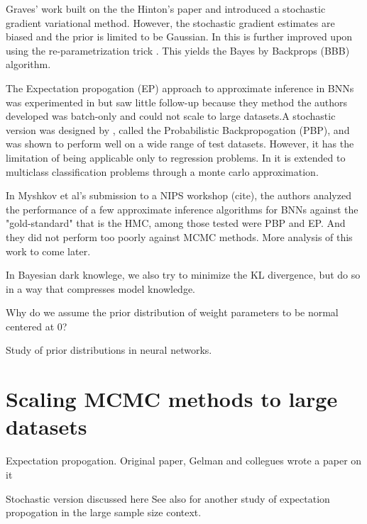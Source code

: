 \documentclass[12pt]{report}
\begin{document}
\begin{enumerate}
Graves' work \cite{graves2011practical} built on the the Hinton's paper and introduced a stochastic gradient variational method. However, the stochastic gradient estimates are biased and the prior is limited to be Gaussian. In \cite{blundell2015weight} this is further improved upon using the re-parametrization trick \cite{opper2009variational,kingma2013auto,rezende2014stochastic}. This yields the Bayes by Backprops (BBB) algorithm.

The Expectation propogation (EP) approach to approximate inference in BNNs was experimented in \cite{jylanki2014expectation} but saw little follow-up because they method the authors developed was batch-only and could not scale to large datasets.A stochastic version was designed by \cite{hernandez2015probabilistic}, called the Probabilistic Backpropogation (PBP), and was shown to perform well on a wide range of test datasets. However, it has the limitation of being applicable only to regression problems. In \cite{ghosh2016assumed} it is extended to multiclass classification problems through a monte carlo approximation. 

In Myshkov et al's submission to a NIPS workshop (cite), the authors analyzed the performance of a few approximate inference algorithms for BNNs against the "gold-standard" that is the HMC, among those tested were PBP and EP. And they did not perform too poorly against MCMC methods. More analysis of this work to come later.  

In Bayesian dark knowlege, we also try to minimize the KL divergence, but do so
in a way that compresses model knowledge.  

Why do we assume the prior distribution of weight parameters to be normal centered at 0?

Study of prior distributions in neural networks.\cite{lampinen2001bayesian,titterington2004bayesian}

\section{Scaling MCMC methods to large datasets}




Expectation propogation. Original paper\cite{minka2001expectation}, Gelman and collegues wrote a paper on it \cite{gelman2014expectation}

Stochastic version discussed here \cite{li2015stochastic}
See also \cite{dehaene2015expectation} for another study of expectation propogation in the large sample size context. 


\end{enumerate}
\end{document}
